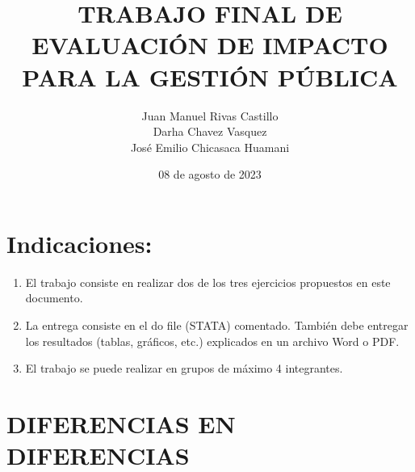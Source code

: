 \documentclass[12pt]{article}
\title{\large\textbf{TRABAJO FINAL DE EVALUACIÓN DE IMPACTO PARA LA GESTIÓN PÚBLICA }}
\author{Juan Manuel Rivas Castillo \\
Darha Chavez Vasquez \\
José Emilio Chicasaca Huamani}
\date{08 de agosto de 2023}
\begin{document}
\maketitle

\newpage
\tableofcontents
\newpage
{}
\section*{Indicaciones:}

\begin{enumerate}
  \item El trabajo consiste en realizar dos de los tres ejercicios propuestos en este documento.
  \item La entrega consiste en el do file (STATA) comentado. También debe entregar los resultados (tablas, gráficos, etc.) explicados en un archivo Word o PDF. 
  \item El trabajo se puede realizar en grupos de máximo 4 integrantes. 
\end{enumerate}


\newpage

\section{DIFERENCIAS EN DIFERENCIAS}
\end{document}
